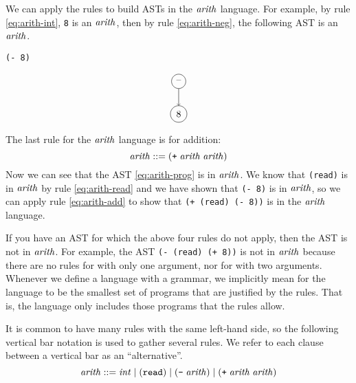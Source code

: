 \documentclass[12pt]{book}
\begin{document}
We can apply the rules to build ASTs in the $\mathit{arith}$
language. For example, by rule \eqref{eq:arith-int}, \texttt{8} is an
$\mathit{arith}$, then by rule \eqref{eq:arith-neg}, the following AST is
an $\mathit{arith}$.
\begin{center}
\begin{minipage}{0.25\textwidth}
\begin{lstlisting}
(- 8)
\end{lstlisting}
\end{minipage}
\begin{minipage}{0.25\textwidth}
\begin{equation}
\begin{tikzpicture}[baseline=(current  bounding  box.center)]
 \node[draw, circle] (minus) at (0, 0)  {$\text{--}$};
 \node[draw, circle] (8)     at (0, -1.2) {$8$};

 \draw[->] (minus) to (8);
\end{tikzpicture}
\label{eq:arith-neg8}
\end{equation}
\end{minipage}
\end{center}

The last rule for the $\mathit{arith}$ language is for addition:
\begin{equation}
  \mathit{arith} ::= (\texttt{+} \; \mathit{arith} \; \mathit{arith}) \label{eq:arith-add}
\end{equation}
Now we can see that the AST \eqref{eq:arith-prog} is in $\mathit{arith}$.
We know that \lstinline{(read)} is in $\mathit{arith}$ by rule
\eqref{eq:arith-read} and we have shown that \texttt{(- 8)} is in
$\mathit{arith}$, so we can apply rule \eqref{eq:arith-add} to show that
\texttt{(+ (read) (- 8))} is in the $\mathit{arith}$ language.

If you have an AST for which the above four rules do not apply, then
the AST is not in $\mathit{arith}$. For example, the AST \texttt{(-
  (read) (+ 8))} is not in $\mathit{arith}$ because there are no rules
for \key{+} with only one argument, nor for \key{-} with two
arguments.  Whenever we define a language with a grammar, we
implicitly mean for the language to be the smallest set of programs
that are justified by the rules. That is, the language only includes
those programs that the rules allow.

It is common to have many rules with the same left-hand side, so the
following vertical bar notation is used to gather several rules.  We
refer to each clause between a vertical bar as an ``alternative''.
\[
\mathit{arith} ::= \mathit{int} \mid ({\tt \texttt{read}}) \mid (\texttt{-} \; \mathit{arith}) \mid
   (\texttt{+} \; \mathit{arith} \; \mathit{arith}) 
\]
\end{document}
